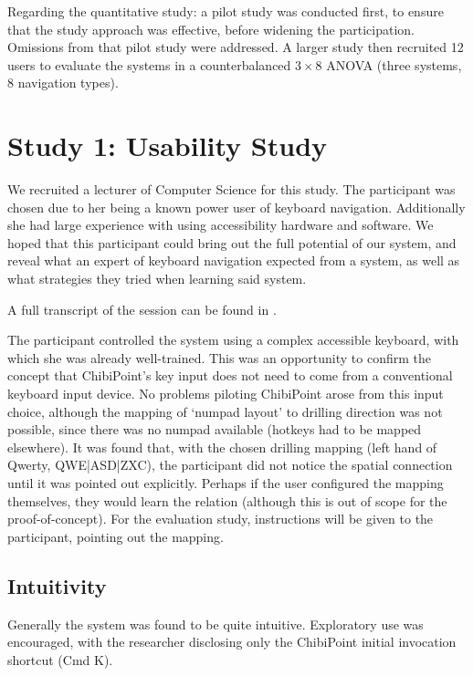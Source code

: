 \documentclass[a4paper, 12pt]{report}
\begin{document}
Regarding the quantitative study: a pilot study was conducted first, to ensure that the study approach was effective, before widening the participation. Omissions from that pilot study were addressed.
A larger study then recruited 12 users to evaluate the systems in a counterbalanced $3 \times 8$ ANOVA (three systems, 8 navigation types).

\section{Study 1: Usability Study}
We recruited a lecturer of Computer Science for this study. The participant was chosen due to her being a known power user of keyboard navigation. Additionally she had large experience with using accessibility hardware and software. We hoped that this participant could bring out the full potential of our system, and reveal what an expert of keyboard navigation expected from a system, as well as what strategies they tried when learning said system.

A full transcript of the session can be found in .

The participant controlled the system using a complex accessible keyboard, with which she was already well-trained. This was an opportunity to confirm the concept that ChibiPoint's key input does not need to come from a conventional keyboard input device. No problems piloting ChibiPoint arose from this input choice, although the mapping of `numpad layout' to drilling direction was not possible, since there was no numpad available (hotkeys had to be mapped elsewhere). It was found that, with the chosen drilling mapping (left hand of Qwerty, QWE|ASD|ZXC), the participant did not notice the spatial connection until it was pointed out explicitly. Perhaps if the user configured the mapping themselves, they would learn the relation (although this is out of scope for the proof-of-concept). For the evaluation study, instructions will be given to the participant, pointing out the mapping.

\subsection{Intuitivity}
Generally the system was found to be quite intuitive. Exploratory use was encouraged, with the researcher disclosing only the ChibiPoint initial invocation shortcut (Cmd K).
\end{document}
